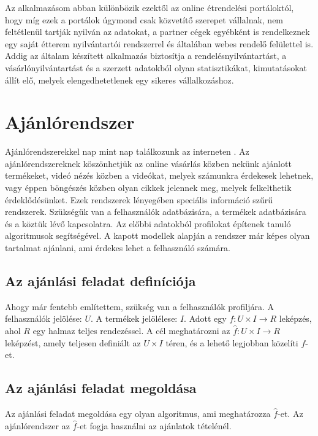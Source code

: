 Az alkalmazásom abban különbözik ezektől az online étrendelési portáloktól, hogy míg ezek a portálok úgymond csak közvetítő szerepet vállalnak, nem feltétlenül tartják nyilván az adatokat, a partner cégek egyébként is rendelkeznek egy saját étterem nyilvántartói rendszerrel és általában webes rendelő felülettel is. Addig az általam készített alkalmazás biztosítja a rendelésnyilvántartást, a vásárlónyilvántartást és a szerzett adatokból olyan statisztikákat, kimutatásokat állít elő, melyek elengedhetetlenek egy sikeres vállalkozáshoz.

\section{Ajánlórendszer}

Ajánlórendszerekkel nap mint nap találkozunk az interneten \cite{recommender_system}. Az ajánlórendszereknek köszönhetjük az online vásárlás közben nekünk ajánlott termékeket, videó nézés közben a videókat, melyek számunkra érdekesek lehetnek, vagy éppen böngészés közben olyan cikkek jelennek meg, melyek felkelthetik érdeklődésünket. Ezek rendszerek lényegében speciális információ szűrű rendszerek. Szükségük van a felhasználók adatbázisára, a termékek adatbázisára és a köztük lévő kapcsolatra. Az előbbi adatokból profilokat építenek tanuló algoritmusok segítségével. A kapott modellek alapján a rendszer már képes olyan tartalmat ajánlani, ami érdekes lehet a felhasználó számára.

\subsection{Az ajánlási feladat definíciója}

Ahogy már fentebb említettem, szükség van a felhasználók profiljára. A felhasználók jelölése: $U$. A termékek jelölélese: $I$. Adott egy $f: U \times I \rightarrow R$ leképzés, ahol $R$ egy halmaz teljes rendezéssel. A cél meghatározni az $\hat{f}: U \times I \rightarrow R$ leképzést, amely teljesen definiált az $U \times I$ téren, és a lehető legjobban közelíti $f$-et.

\subsection{Az ajánlási feladat megoldása}

Az ajánlási feladat megoldása egy olyan algoritmus, ami meghatározza $\hat{f}$-et. Az ajánlórendszer az $\hat{f}$-et fogja használni az ajánlatok tételénél.

